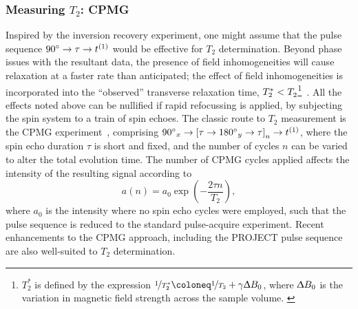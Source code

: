 \subsubsection{Measuring $T_2$: \acs{CPMG}}
\label{subsec:cpmg}
Inspired by the inversion recovery experiment, one might assume
that the pulse sequence $\ang{90} \rightarrow \tau \rightarrow t^{(1)}$ would be
effective for  $T_2$ determination.
\label{corr:T2-issues}
Beyond phase issues with the resultant data, the
presence of field inhomogeneities will cause relaxation at a faster rate than
anticipated; the effect of field inhomogeneities is incorporated into the
``observed'' transverse relaxation time, $T_2^* < T_2^{\vphantom{*}}$\footnote{
    $T_2^*$ is defined by the expression
    $\nicefrac{1}{T_2^*} \coloneq \nicefrac{1}{T_2} + \gamma \Updelta B_0$,
    where $\Updelta B_0$ is the variation in magnetic field strength across the
    sample volume.
    \label{fn:t2-star}
}~\cite{Chavhan2009}. All the effects noted above can be nullified if rapid
refocussing is applied, by subjecting the spin system to a train of spin
echoes. The classic route to $T_2$ measurement is the \ac{CPMG}
experiment~\cite{Carr1954,Meiboom1958}, comprising $\ang{90}_x \rightarrow
\left[ \tau \rightarrow \ang{180}_y \rightarrow \tau \right]_n \rightarrow
t^{(1)}$, where the spin echo duration $\tau$ is short and fixed, and the number
of cycles $n$ can be varied to alter the total evolution time. The number of
\ac{CPMG} cycles applied affects the intensity of the resulting signal
according to
\begin{equation}
    a(n) = a_0 \exp\left(-\frac{2 \tau n}{T_2}\right),
\end{equation}
where $a_0$ is the intensity where no spin echo cycles were employed, such that
the pulse sequence is reduced to the standard pulse-acquire experiment. Recent
enhancements to the \ac{CPMG} approach, including the \ac{PROJECT} pulse
sequence~\cite{Aguilar2012} are also well-suited to $T_2$ determination.


